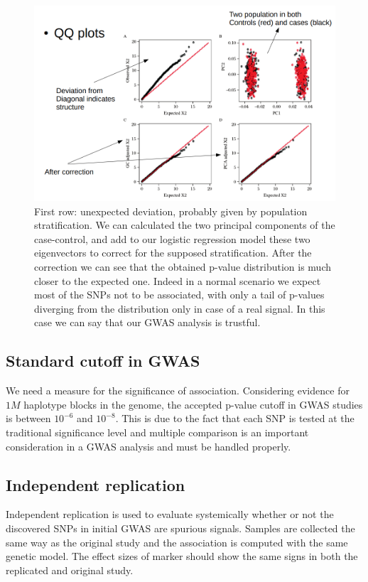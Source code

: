 			
			\begin{figure}[H]
			\centering
			\includegraphics[scale=0.3]{qq}
			\caption{First row: unexpected deviation, probably given by population stratification. We can calculated the two principal components of the case-control, and add to our logistic regression model these two eigenvectors to correct for the supposed stratification. After the correction we can see that the obtained p-value distribution is much closer to the expected one. Indeed in a normal scenario we expect most of the SNPs not to be associated, with only a tail of p-values diverging from the distribution only in case of a real signal. In this case we can say that our GWAS analysis is trustful. }
			\label{fig:qq}
			\end{figure}
	
	\subsection{Standard cutoff in GWAS}
	We need a measure for the significance of association.
	Considering evidence for $1M$ haplotype blocks in the genome, the accepted p-value cutoff in GWAS studies is between $10^{-6}$ and $10^{-8}$.
	This is due to the fact that each SNP is tested at the traditional significance level and multiple comparison is an important consideration in a GWAS analysis and must be handled properly.

	\subsection{Independent replication}
	Independent replication is used to evaluate systemically whether or not the discovered SNPs in initial GWAS are spurious signals.
	Samples are collected the same way as the original study and the association is computed with the same genetic model.
	The effect sizes of marker should show the same signs in both the replicated and original study.
